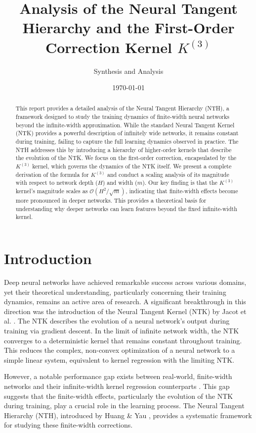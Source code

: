 \documentclass{article}
\title{Analysis of the Neural Tangent Hierarchy and the First-Order Correction Kernel $K^{(3)}$}
\author{Synthesis and Analysis}
\date{\today}
\begin{document}
\maketitle

\begin{abstract}
This report provides a detailed analysis of the Neural Tangent Hierarchy (NTH), a framework designed to study the training dynamics of finite-width neural networks beyond the infinite-width approximation. While the standard Neural Tangent Kernel (NTK) provides a powerful description of infinitely wide networks, it remains constant during training, failing to capture the full learning dynamics observed in practice. The NTH addresses this by introducing a hierarchy of higher-order kernels that describe the evolution of the NTK. We focus on the first-order correction, encapsulated by the $K^{(3)}$ kernel, which governs the dynamics of the NTK itself. We present a complete derivation of the formula for $K^{(3)}$ and conduct a scaling analysis of its magnitude with respect to network depth ($H$) and width ($m$). Our key finding is that the $K^{(3)}$ kernel's magnitude scales as $\mathcal{O}(H^2/\sqrt{m})$, indicating that finite-width effects become more pronounced in deeper networks. This provides a theoretical basis for understanding why deeper networks can learn features beyond the fixed infinite-width kernel.
\end{abstract}

\tableofcontents
\newpage

\section{Introduction}

Deep neural networks have achieved remarkable success across various domains, yet their theoretical understanding, particularly concerning their training dynamics, remains an active area of research. A significant breakthrough in this direction was the introduction of the Neural Tangent Kernel (NTK) by Jacot et al. \cite{jacot2018neural}. The NTK describes the evolution of a neural network's output during training via gradient descent. In the limit of infinite network width, the NTK converges to a deterministic kernel that remains constant throughout training. This reduces the complex, non-convex optimization of a neural network to a simple linear system, equivalent to kernel regression with the limiting NTK.

However, a notable performance gap exists between real-world, finite-width networks and their infinite-width kernel regression counterparts \cite{arora2019exact}. This gap suggests that the finite-width effects, particularly the evolution of the NTK during training, play a crucial role in the learning process. The Neural Tangent Hierarchy (NTH), introduced by Huang \& Yau \cite{huang2019dynamics}, provides a systematic framework for studying these finite-width corrections.
\end{document}
